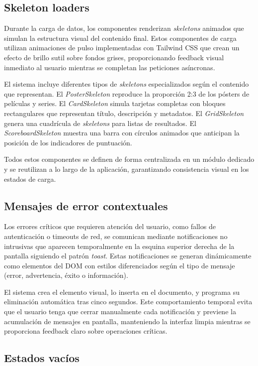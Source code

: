 \subsection{Skeleton loaders}

Durante la carga de datos, los componentes renderizan \textit{skeletons} animados que simulan la estructura visual del contenido final. Estos componentes de carga utilizan animaciones de pulso implementadas con Tailwind CSS que crean un efecto de brillo sutil sobre fondos grises, proporcionando feedback visual inmediato al usuario mientras se completan las peticiones asíncronas.

El sistema incluye diferentes tipos de \textit{skeletons} especializados según el contenido que representan. El \textit{PosterSkeleton} reproduce la proporción 2:3 de los pósters de películas y series. El \textit{CardSkeleton} simula tarjetas completas con bloques rectangulares que representan título, descripción y metadatos. El \textit{GridSkeleton} genera una cuadrícula de \textit{skeletons} para listas de resultados. El \textit{ScoreboardSkeleton} muestra una barra con círculos animados que anticipan la posición de los indicadores de puntuación.

Todos estos componentes se definen de forma centralizada en un módulo dedicado y se reutilizan a lo largo de la aplicación, garantizando consistencia visual en los estados de carga.

\subsection{Mensajes de error contextuales}

Los errores críticos que requieren atención del usuario, como fallos de autenticación o timeouts de red, se comunican mediante notificaciones no intrusivas que aparecen temporalmente en la esquina superior derecha de la pantalla siguiendo el patrón \textit{toast}. Estas notificaciones se generan dinámicamente como elementos del DOM con estilos diferenciados según el tipo de mensaje (error, advertencia, éxito o información).

El sistema crea el elemento visual, lo inserta en el documento, y programa su eliminación automática tras cinco segundos. Este comportamiento temporal evita que el usuario tenga que cerrar manualmente cada notificación y previene la acumulación de mensajes en pantalla, manteniendo la interfaz limpia mientras se proporciona feedback claro sobre operaciones críticas.

\subsection{Estados vacíos}

